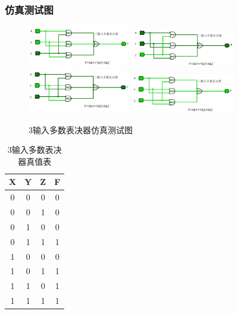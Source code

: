 \documentclass{article}
\begin{document}
    \subsubsection{仿真测试图}
    \begin{figure}[H]
    \centering
    \includegraphics[width=0.4\textwidth]{1.4.1.png}
    \includegraphics[width=0.4\textwidth]{1.4.2.png}
    \includegraphics[width=0.4\textwidth]{1.4.3.png}
    \includegraphics[width=0.4\textwidth]{1.4.4.png}
    \caption{3输入多数表决器仿真测试图}
    \end{figure}

    \begin{table}[H]
    \centering
    \begin{tabular}{|c c c|c|}
        \hline
        X & Y & Z & F \\ \hline
        0 & 0 & 0 & 0 \\ \hline
        0 & 0 & 1 & 0 \\ \hline
        0 & 1 & 0 & 0 \\ \hline
        0 & 1 & 1 & 1 \\ \hline
        1 & 0 & 0 & 0 \\ \hline
        1 & 0 & 1 & 1 \\ \hline
        1 & 1 & 0 & 1 \\ \hline
        1 & 1 & 1 & 1 \\ \hline
    \end{tabular}
    \caption{3输入多数表决器真值表}
    \end{table}
\end{document}
